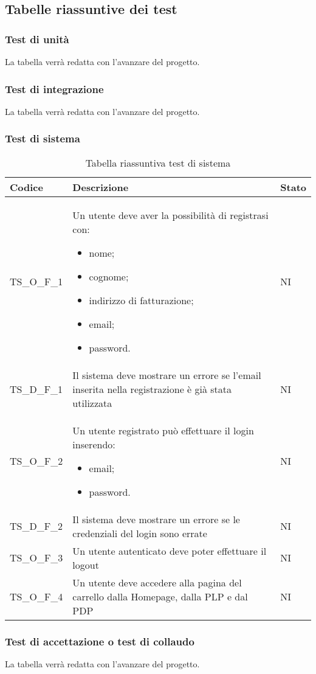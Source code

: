 \subsection{Tabelle riassuntive dei test}

\subsubsection{Test di unità}
La tabella verrà redatta con l'avanzare del progetto.

\subsubsection{Test di integrazione}
La tabella verrà redatta con l'avanzare del progetto.

\subsubsection{Test di sistema}
{

\centering
\renewcommand{\arraystretch}{2}
\begin{longtable}{C{3cm} C{10.2cm} C{1.5cm}}
\caption{Tabella riassuntiva test di sistema}\\
\textbf{Codice} &
\textbf{Descrizione}&
\textbf{Stato}\\
\endhead


TS\_O\_F\_1 & Un utente deve aver la possibilità di registrasi con:
\begin{itemize}
	\item nome;
	\item cognome;
	\item indirizzo di fatturazione;
	\item email;
	\item password.
\end{itemize} & NI\\
TS\_D\_F\_1 & Il sistema deve mostrare un errore se
l’email inserita nella registrazione è già stata utilizzata & NI\\
TS\_O\_F\_2 & Un utente registrato può effettuare il login inserendo:
\begin{itemize}
	\item email;
	\item password.
\end{itemize} &  NI\\
TS\_D\_F\_2 & Il sistema deve mostrare un errore se le credenziali del login sono errate & NI\\
TS\_O\_F\_3 & Un utente autenticato deve poter effettuare il
logout & NI\\
TS\_O\_F\_4 & Un utente deve accedere alla pagina del carrello dalla Homepage, dalla PLP e dal PDP & NI\\

\end{longtable}


}
\subsubsection{Test di accettazione o test di collaudo}
La tabella verrà redatta con l'avanzare del progetto.